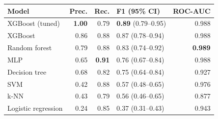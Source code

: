 \begin{tabular}{@{}lrrlr@{}}
\toprule
Model & Prec. & Rec. & F1 (95\% CI) & ROC-AUC \\
\midrule
XGBoost (tuned) & \textbf{1.00} & 0.79 & \textbf{0.89} (0.79--0.95) & 0.988 \\
XGBoost & 0.86 & 0.88 & 0.87 (0.78--0.94) & 0.988 \\
Random forest & 0.79 & 0.88 & 0.83 (0.74--0.92) & \textbf{0.989} \\
MLP & 0.65 & \textbf{0.91} & 0.76 (0.67--0.84) & 0.988 \\
Decision tree & 0.68 & 0.82 & 0.75 (0.64--0.84) & 0.927 \\
SVM & 0.42 & 0.88 & 0.57 (0.48--0.65) & 0.976 \\
k-NN & 0.43 & 0.79 & 0.56 (0.46--0.65) & 0.877 \\
Logistic regression & 0.24 & 0.85 & 0.37 (0.31--0.43) & 0.943 \\
\bottomrule
\end{tabular}
